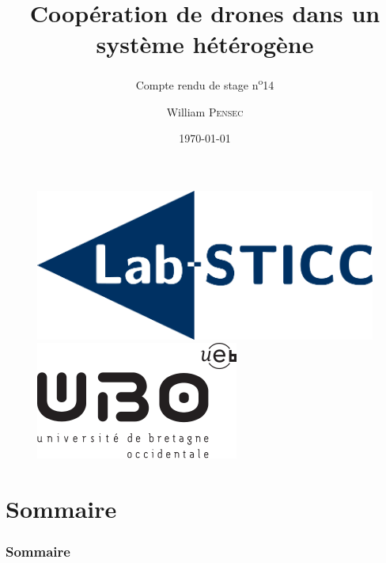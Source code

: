 \documentclass[12pt]{beamer}
\title[Compte rendu de stage n\textsuperscript{o}14]{Coopération de drones dans un système hétérogène}
\subtitle{Compte rendu de stage n\textsuperscript{o}14}
\author{William \textsc{Pensec}}
\institute[Lab-STICC]{Lab-Sticc}
\date{\today}
\begin{document}
	\begin{frame}
		\begin{titlepage}
			\begin{figure}[H]
				\centering
				\includegraphics[scale=.15]{labsticc.png}
				\hspace{3cm}
				\includegraphics[scale=.3]{ubo.png}
			\end{figure}
		\end{titlepage}
	\end{frame}
	
	\section*{Sommaire}
	\begin{frame}
		\frametitle{Sommaire}
		\begin{center}
			\tableofcontents
		\end{center}
	\end{frame}
\end{document}
